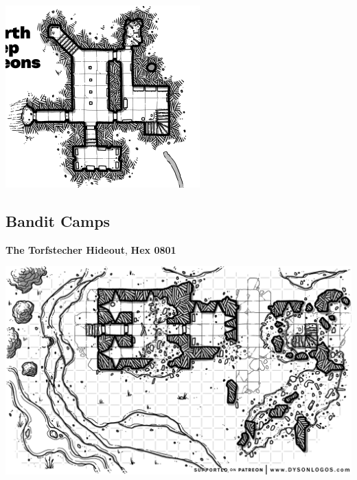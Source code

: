 \documentclass[
]{book}
\begin{document}
\begin{center}\includegraphics[width=1\linewidth]{graphics/miserth-keep-dungeons_alt} \end{center}

\subsection{Bandit Camps}\label{bandit-camps}

\textbf{The Torfstecher Hideout}, \textbf{Hex 0801}

\begin{center}\includegraphics[width=1\linewidth]{graphics/index-card-dungeon-surface-ruins-1} \end{center}
\end{document}
